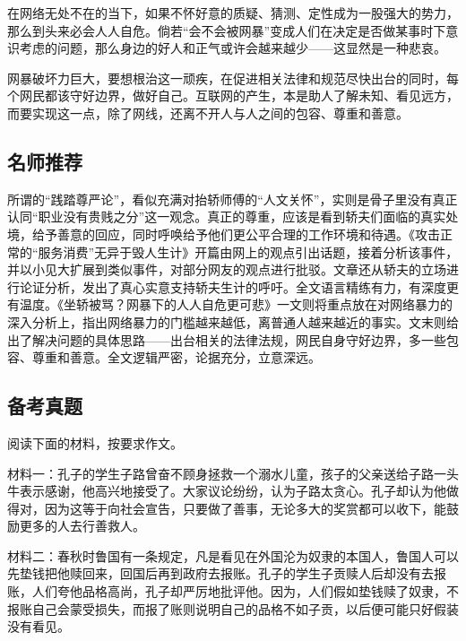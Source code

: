 在网络无处不在的当下，如果不怀好意的质疑、猜测、定性成为一股强大的势力，那么到头来必会人人自危。倘若“会不会被网暴”变成人们在决定是否做某事时下意识考虑的问题，那么身边的好人和正气或许会越来越少——这显然是一种悲哀。

网暴破坏力巨大，要想根治这一顽疾，在促进相关法律和规范尽快出台的同时，每个网民都该守好边界，做好自己。互联网的产生，本是助人了解未知、看见远方，而要实现这一点，除了网线，还离不开人与人之间的包容、尊重和善意。


\subsection*{名师推荐}

所谓的“践踏尊严论”，看似充满对抬轿师傅的“人文关怀”，实则是骨子里没有真正认同“职业没有贵贱之分”这一观念。真正的尊重，应该是看到轿夫们面临的真实处境，给予善意的回应，同时呼唤给予他们更公平合理的工作环境和待遇。《攻击正常的“服务消费”无异于毁人生计》开篇由网上的观点引出话题，接着分析该事件，并以小见大扩展到类似事件，对部分网友的观点进行批驳。文章还从轿夫的立场进行论证分析，发出了真心实意支持轿夫生计的呼吁。全文语言精练有力，有深度更有温度。《坐轿被骂？网暴下的人人自危更可悲》一文则将重点放在对网络暴力的深入分析上，指出网络暴力的门槛越来越低，离普通人越来越近的事实。文末则给出了解决问题的具体思路——出台相关的法律法规，网民自身守好边界，多一些包容、尊重和善意。全文逻辑严密，论据充分，立意深远。

\subsection*{备考真题}

阅读下面的材料，按要求作文。

材料一：孔子的学生子路曾奋不顾身拯救一个溺水儿童，孩子的父亲送给子路一头牛表示感谢，他高兴地接受了。大家议论纷纷，认为子路太贪心。孔子却认为他做得对，因为这等于向社会宣告，只要做了善事，无论多大的奖赏都可以收下，能鼓励更多的人去行善救人。

材料二：春秋时鲁国有一条规定，凡是看见在外国沦为奴隶的本国人，鲁国人可以先垫钱把他赎回来，回国后再到政府去报账。孔子的学生子贡赎人后却没有去报账，人们夸他品格高尚，孔子却严厉地批评他。因为，人们假如垫钱赎了奴隶，不报账自己会蒙受损失，而报了账则说明自己的品格不如子贡，以后便可能只好假装没有看见。

